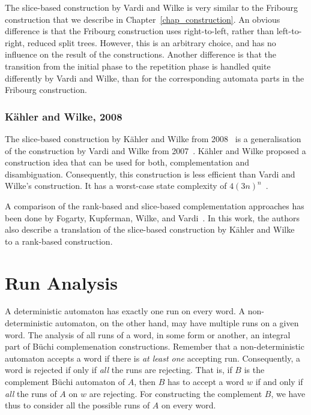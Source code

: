 The slice-based construction by Vardi and Wilke is very similar to the Fribourg construction that we describe in Chapter~\ref{chap_construction}. An obvious difference is that the Fribourg construction uses right-to-left, rather than left-to-right, reduced split trees. However, this is an arbitrary choice, and has no influence on the result of the constructions. Another difference is that the transition from the initial phase to the repetition phase is handled quite differently by Vardi and Wilke, than for the corresponding automata parts in the Fribourg construction.

\subsubsection{Kähler and Wilke, 2008}
The slice-based construction by Kähler and Wilke from 2008~\cite{2008_kaehler} is a generalisation of the construction by Vardi and Wilke from 2007~\cite{vardi2007automata}. Kähler and Wilke proposed a construction idea that can be used for both, complementation and disambiguation. Consequently, this construction is less efficient than Vardi and Wilke's construction. It has a worst-case state complexity of $4(3n)^n$~\cite{2011_tsai}.

A comparison of the rank-based and slice-based complementation approaches has been done by Fogarty, Kupferman, Wilke, and Vardi~\cite{fogarty2013unifying}. In this work, the authors also describe a translation of the slice-based construction by Kähler and Wilke~\cite{2008_kaehler} to a rank-based construction.







\section{Run Analysis}
A deterministic automaton has exactly one run on every word. A non-deterministic automaton, on the other hand, may have multiple runs on a given word. The analysis of all runs of a word, in some form or another, an integral part of Büchi complemenation constructions. Remember that a non-deterministic automaton accepts a word if there is \emph{at least one} accepting run. Consequently, a word is rejected if only if \emph{all} the runs are rejecting. That is, if $B$ is the complement Büchi automaton of $A$, then $B$ has to accept a word $w$ if and only if \emph{all} the runs of $A$ on $w$ are rejecting. For constructing the complement $B$, we have thus to consider all the possible runs of $A$ on every word.

